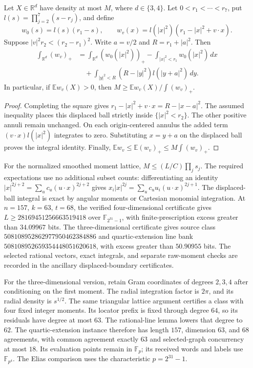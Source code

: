 \begin{proposition}
Let $X\in\mathbb R^d$ have density at most $M$, where $d\in\{3,4\}$.
Let $0<r_1<\cdots<r_7$, put
$l(s)=\prod_{j=2}^7(s-r_j)$, and define
\[
 w_0(s)=l(s)(r_1-s),\qquad
 w_v(x)=l(|x|^2)(r_1-|x|^2+v\cdot x).
\]
Suppose $|v|^2r_2<(r_2-r_1)^2$. Write $a=v/2$ and
$R=r_1+|a|^2$. Then
\begin{align*}
 \int_{\mathbb R^d}(w_v)_+
 &=\int_{\mathbb R^d}(w_0(|x|^2))_+
   -\int_{|x|^2<r_1}w_0(|x|^2)\,dx\\
 &\quad+\int_{|y|^2<R}(R-|y|^2)l(|y+a|^2)\,dy.
\end{align*}
In particular, if $\mathbb E w_v(X)>0$, then
$M\ge\mathbb E w_v(X)/\int(w_v)_+$.
\end{proposition}

\begin{proof}
Completing the square gives
$r_1-|x|^2+v\cdot x=R-|x-a|^2$.
The assumed inequality places this displaced ball strictly inside
$\{|x|^2<r_2\}$. The other positive annuli remain unchanged. On each
origin-centered annulus the added term $(v\cdot x)l(|x|^2)$ integrates
to zero. Substituting $x=y+a$ on the displaced ball proves the integral
identity. Finally, $\mathbb E w_v\le\mathbb E(w_v)_+\le M\int(w_v)_+$.
\end{proof}

For the normalized smoothed moment lattice, $M\le(L/C)\prod_js_j$.
The required expectations use no additional subset counts: differentiating
an identity $|x|^{2j+2}=\sum_u c_u(u\cdot x)^{2j+2}$ gives
$x_i|x|^{2j}=\sum_u c_u u_i(u\cdot x)^{2j+1}$.
The displaced-ball integral is exact by angular moments or Cartesian
monomial integration. At $n=157$, $k=63$, $t=68$, the verified
four-dimensional certificate gives $L\ge28169451256663519418$ over
$\mathbb F_{2^{31}-1}$, with finite-prescription excess greater than
$34.09967$ bits. The three-dimensional certificate gives source class
$508108952862977950462384886$ and quartic-extension line bank
$508108952659354448051620618$, with excess greater than $50.90955$ bits.
The selected rational vectors, exact integrals, and separate raw-moment
checks are recorded in the ancillary displaced-boundary certificates.

For the three-dimensional version, retain Gram coordinates of degrees
$2,3,4$ after conditioning on the first moment. The radial integration
factor is $2\pi$, and its radial density is $s^{1/2}$. The same triangular
lattice argument certifies a class with four fixed integer moments.
Its locator prefix is fixed through degree $64$, so its residuals have
degree at most $63$. The rational-line lemma lowers that degree to $62$.
The quartic-extension instance therefore has length $157$, dimension $63$,
and $68$ agreements, with common agreement exactly $63$ and selected-graph
concurrency at most $18$. Its evaluation points remain in $\mathbb F_p$;
its received words and labels use $\mathbb F_{p^4}$. The Elias comparison
uses the characteristic $p=2^{31}-1$.

